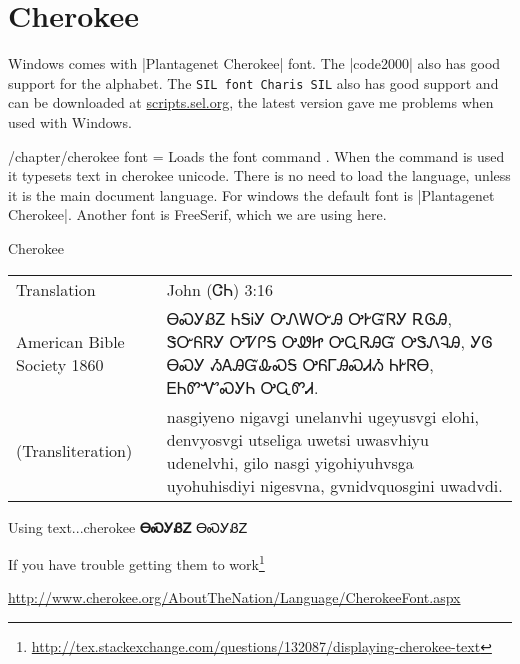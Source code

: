 
\section{Cherokee}

Windows comes with |Plantagenet Cherokee| font. The |code2000| also has good support for the alphabet. The \texttt{SIL font Charis SIL} also has good support and can be downloaded at \href{http://scripts.sil.org/cms/scripts/page.php?item_id=CharisSIL_download}{scripts.sel.org}, the latest version gave me problems when used with Windows. 




\newfontfamily{}%
  
\def\textcherokee#1{{\cherokee   #1}}


\begin{key}{/chapter/cherokee font = } Loads the font
command \cmd{\cherokee}. When the command is used it typesets text in
cherokee unicode. There is no need to load the language, unless it is the main document language. For windows the default font is  |Plantagenet Cherokee|. Another font is FreeSerif, which we are using here.
\end{key}

\begin{scriptexample}[]{Cherokee}
{\cherokee
\begin{tabular}{lp{8.5cm}}
Translation	  &John (ᏣᏂ) 3:16\\
American Bible Society 1860	&ᎾᏍᎩᏰᏃ ᏂᎦᎥᎩ ᎤᏁᎳᏅᎯ ᎤᎨᏳᏒᎩ ᎡᎶᎯ, ᏕᏅᏲᏒᎩ ᎤᏤᎵᎦ ᎤᏪᏥ ᎤᏩᏒᎯᏳ ᎤᏕᏁᎸᎯ, ᎩᎶ ᎾᏍᎩ ᏱᎪᎯᏳᎲᏍᎦ ᎤᏲᎱᎯᏍᏗᏱ ᏂᎨᏒᎾ, ᎬᏂᏛᏉᏍᎩᏂ ᎤᏩᏛᏗ.\\

(Transliteration)	& nasgiyeno nigavgi unelanvhi ugeyusvgi elohi, denvyosvgi utseliga uwetsi uwasvhiyu udenelvhi, gilo nasgi yigohiyuhvsga uyohuhisdiyi nigesvna, gvnidvquosgini uwadvdi.\\
\end{tabular}}
\end{scriptexample}

\begin{texexample}{Using text...}{cherokee}
\bgroup
\cherokee \large\textbf{ᎾᏍᎩᏰᏃ}
\textcherokee{ᎾᏍᎩᏰᏃ}
\egroup
\end{texexample}

If you have trouble getting them to work\footnote{\url{http://tex.stackexchange.com/questions/132087/displaying-cherokee-text}}

\url{http://www.cherokee.org/AboutTheNation/Language/CherokeeFont.aspx}



